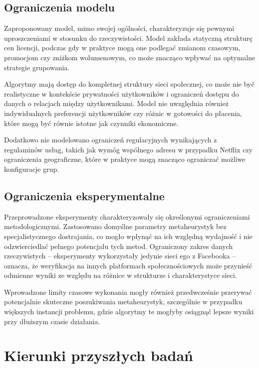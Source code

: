 \subsection{Ograniczenia modelu}

Zaproponowany model, mimo swojej ogólności, charakteryzuje się pewnymi uproszczeniami w stosunku do rzeczywistości. Model zakłada statyczną strukturę cen licencji, podczas gdy w praktyce mogą one podlegać zmianom czasowym, promocjom czy zniżkom wolumenowym, co może znacząco wpływać na optymalne strategie grupowania.

Algorytmy mają dostęp do kompletnej struktury sieci społecznej, co może nie być realistyczne w kontekście prywatności użytkowników i ograniczeń dostępu do danych o relacjach między użytkownikami. Model nie uwzględnia również indywidualnych preferencji użytkowników czy różnic w gotowości do płacenia, które mogą być równie istotne jak czynniki ekonomiczne.

Dodatkowo nie modelowano ograniczeń regulacyjnych wynikających z regulaminów usług, takich jak wymóg wspólnego adresu w przypadku Netflix czy ograniczenia geograficzne, które w praktyce mogą znacząco ograniczać możliwe konfiguracje grup.

\subsection{Ograniczenia eksperymentalne}

Przeprowadzone eksperymenty charakteryzowały się określonymi ograniczeniami metodologicznymi. Zastosowano domyślne parametry metaheurystyk bez specjalistycznego dostrajania, co mogło wpłynąć na ich względną wydajność i nie odzwierciedlać pełnego potencjału tych metod. Ograniczony zakres danych rzeczywistych -- eksperymenty wykorzystały jedynie sieci ego z Facebooka -- oznacza, że weryfikacja na innych platformach społecznościowych może przynieść odmienne wyniki ze względu na różnice w strukturze i charakterystyce sieci.

Wprowadzone limity czasowe wykonania mogły również przedwcześnie przerywać potencjalnie skuteczne poszukiwania metaheurystyk, szczególnie w przypadku większych instancji problemu, gdzie algorytmy te mogłyby osiągnąć lepsze wyniki przy dłuższym czasie działania.

\section{Kierunki przyszłych badań}

